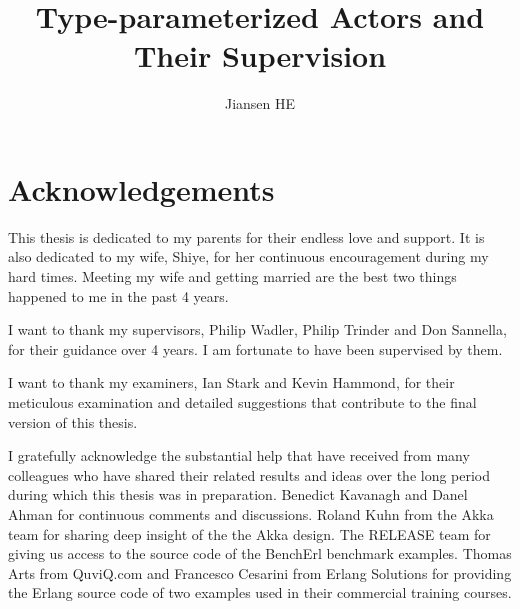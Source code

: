 \documentclass[mphil, 12 pt]{csthesis}
\begin{document}

\title{Type-parameterized Actors and Their Supervision}
\author{Jiansen HE}

\maketitle 



\section*{Acknowledgements}

This thesis is dedicated to my parents for their endless love and support.
It is also dedicated to my wife, Shiye, for her continuous encouragement
during my hard times.  Meeting my wife and getting married are the best
two things happened to me in the past 4 years.

I want to thank my supervisors, Philip Wadler, Philip Trinder and Don Sannella,
for their guidance over 4 years.  I am fortunate to have been supervised
by them.  

I want to thank my examiners, Ian Stark and Kevin Hammond, for their 
meticulous examination and detailed suggestions that contribute to the final version
of this thesis.

I gratefully acknowledge the substantial help that have received from many 
colleagues who have shared their related results and ideas over the long period 
during which this thesis was in preparation. Benedict Kavanagh and Danel Ahman 
for continuous comments and discussions. Roland Kuhn from the Akka team for 
sharing deep insight of the the Akka design.  
The RELEASE team for giving us access to the source code of the BenchErl 
benchmark examples.  Thomas Arts from QuviQ.com and Francesco Cesarini from 
Erlang Solutions for providing the Erlang source code of two examples used 
in their commercial training courses.




\setcounter{tocdepth}{1}
\standarddeclaration
\oneandahalfspace
\tableofcontents

\end{document}
